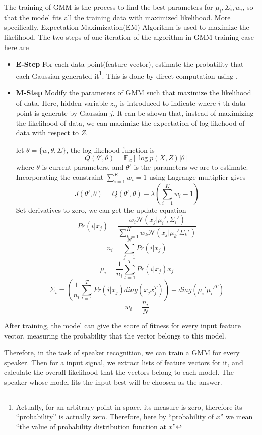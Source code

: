 The training of GMM is the process to find the best parameters for $ \mu_i, \Sigma_i, w_i$,
so that the model fits all the training data with maximized likelihood.
More specifically, Expectation-Maximization(EM)
Algorithm\cite{bilmes1998gentle} is used to maximize the likelihood.
The two steps of one iteration of the algorithm in GMM training case here are
\begin{itemize}
	\item \textbf{E-Step} For each data point(feature vector), estimate the probatility that
		each Gaussian generated it\footnote{Actually, for an arbitrary point in
			space, its measure is zero, therefore its ``probability'' is
			actually zero. Therefore, here by ``probability of $x$'' we mean
			``the value of probability distribution function at $x$'' }.
			This is done by direct computation using .
	\item \textbf{M-Step} Modify the parameters of GMM such that maximize the
		likelihood of data. Here, hidden variable $z_{ij}$ is introduced
		to indicate where $i$-th data point is generate by Gaussian $j$.
		It can be shown that, instead of maximizing the
		likelihood of data, we can maximize the expectation of log likehood
		of data with respect to $Z$.

		let $\theta = \{w, \theta, \Sigma\}$, the log likehood function is
		\[Q(\theta', \theta) = \mathbb{E}_{Z} [\log p(X, Z) | \theta]\]
		where $\theta$ is current parameters, and $\theta'$ is the parameters
		we are to estimate. Incorporating the constraint $\sum_{i=1}^{K} w_i = 1$ using
		Lagrange multiplier gives
		\[J(\theta', \theta) = Q(\theta', \theta) - \lambda\left(\sum_{i=1}^{K} w_i - 1 \right)\]
		Set derivatives to zero, we can get the update equation
		\[Pr(i| x_j) = \dfrac{w_i \mathcal{N}(x_j | \mu_i', \Sigma_i')}{
			\sum_{k=1}^{K} w_k \mathcal{N}(x_j | \mu_k' \Sigma_k')}\]
		\[n_i = \sum_{j=1}^N Pr(i| x_j)\]
		\[\mu_i = \dfrac{1}{n_i} \sum_{t=1}^{T} Pr(i |x_j) x_j\]
		\[\Sigma_i = \left(\dfrac{1}{n_i} \sum_{t=1}^{T} Pr(i |x_j) diag(x_j x_j^T)\right) -
		diag(\mu_i' \mu_i'^T)\]
		\[w_i = \dfrac{n_i}{N}\]

\end{itemize}



After training, the model can give the score of fitness for every input feature vector,
measuring the probability that the vector belongs to this model.

Therefore, in the task of speaker recognition, we can train a GMM for every speaker.
Then for a input signal, we extract lists of feature vectors for it, and calculate the
overall likelihood that the vectors belong to each model.
The speaker whose model fits the input best will be choosen as the answer.

